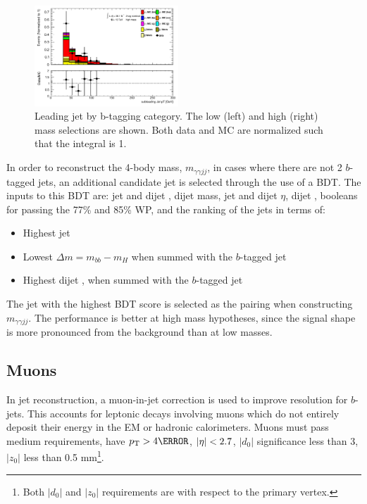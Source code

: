 \begin{figure}[p]
  \includegraphics[width=0.48\textwidth]{chapters/chapter5_yybb/images/data_MC_comparison/h_SR_h_2t_nominal_subleadingJet_pt.pdf}
  \caption[Subleading jet \pt.]{Leading jet \pt by b-tagging category. The low (left) and high (right) mass selections are shown. Both data and MC are normalized such that the integral is 1.
  \label{fig:jet_s_pt}}
\end{figure}


In order to reconstruct the 4-body mass, $m_{\gamma\gamma jj}$, in cases where there are not 2 $b$-tagged jets, an additional candidate jet is selected through the use of a \gls{BDT}. The inputs to this \gls{BDT} are: jet and dijet \pt, dijet mass, jet and dijet $\eta$, dijet \Deta, booleans for passing the 77\% and 85\% \btagging WP, and the ranking of the jets in terms of:

\begin{itemize}
  \item Highest jet \pt
  \item Lowest $\Delta m = m_{bb} - m_H$ when summed with the $b$-tagged jet
  \item Highest dijet \pt, when summed with the $b$-tagged jet
\end{itemize}

The jet with the highest \gls{BDT} score is selected as the pairing when constructing  $m_{\gamma\gamma jj}$. The performance is better at high mass hypotheses, since the signal shape is more pronounced from the background than at low masses. 



\subsection{Muons}

In jet reconstruction, a muon-in-jet correction is used to improve resolution for $b$-jets. This accounts for leptonic decays involving muons which do not entirely deposit their energy in the \gls{EM} or hadronic calorimeters. Muons must pass medium requirements, have $\pt > \unit{4}{\GeV}$, $|\eta| < 2.7$, $|d_{0}|$ significance less than 3, $|z_{0}|$ less than 0.5 mm\footnote{Both $|d_{0}|$ and $|z_{0}|$ requirements are with respect to the primary vertex.}.


